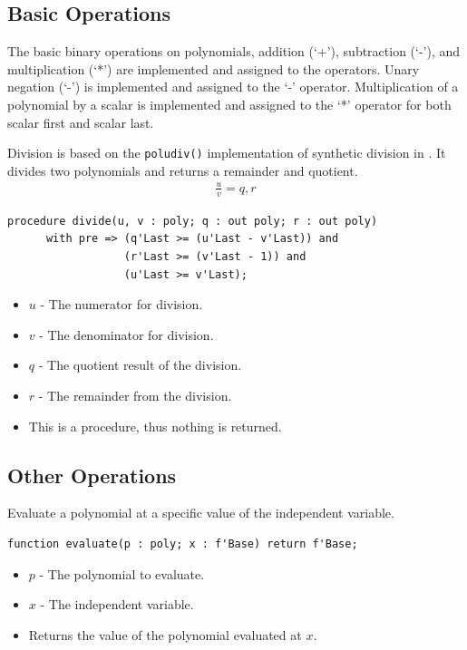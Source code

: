 \documentclass[10pt, openany]{book}
\newcommand{\indexfunc}[1]{\index[func]{#1}}
\newcommand{\function}[1]{\texttt{#1}}
\begin{document}
\subsection{Basic Operations}
The basic binary operations on polynomials, addition (`+'), subtraction (`-'), and multiplication (`*') are implemented and assigned to the operators.  Unary negation (`-') is implemented and assigned to the `-' operator.  Multiplication of a polynomial by a scalar is implemented and assigned to the `*' operator for both scalar first and scalar last.

Division is based on the \function{poludiv()} implementation of synthetic division in \cite{NR-C}.  It divides two polynomials and returns a remainder and quotient.
\begin{align*}
  \frac{u}{v} = q, r
\end{align*}
\begin{lstlisting}
procedure divide(u, v : poly; q : out poly; r : out poly)
      with pre => (q'Last >= (u'Last - v'Last)) and
                  (r'Last >= (v'Last - 1)) and
                  (u'Last >= v'Last);
\end{lstlisting}
\indexfunc{poly-divide}
\begin{itemize}
  \item $u$ - The numerator for division.
  \item $v$ - The denominator for division.
  \item $q$ - The quotient result of the division.
  \item $r$ - The remainder from the division.
  \item This is a procedure, thus nothing is returned.
\end{itemize}

\subsection{Other Operations}

Evaluate a polynomial at a specific value of the independent variable.
\begin{lstlisting}
function evaluate(p : poly; x : f'Base) return f'Base;
\end{lstlisting}
\indexfunc{poly-evaluate}
\begin{itemize}
  \item $p$ - The polynomial to evaluate.
  \item $x$ - The independent variable.
  \item Returns the value of the polynomial evaluated at $x$.
\end{itemize}
\end{document}
